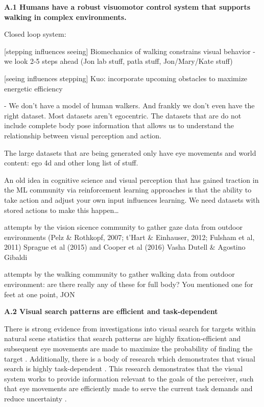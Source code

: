 
\textbf{A.1 Humans have a robust visuomotor control system that supports walking in complex environments.}

Closed loop system:

[stepping influences seeing] Biomechanics of walking constrains visual behavior 
- we look 2-5 steps ahead (Jon lab stuff, patla stuff, Jon/Mary/Kate stuff)

[seeing influences stepping] 
Kuo: incorporate upcoming obstacles to maximize energetic efficiency

- We don't have a model of human walkers. And frankly we don't even have the right dataset.  Most datasets aren't egocentric.  The datasets that are do not include complete body pose information that allows us to understand the relationship between visual perception and action.

The large datasets that are being generated only have eye movements and world content: ego 4d and other long list of stuff. 

An old idea in cognitive science and visual perception that has gained traction in the ML community via reinforcement learning approaches is that the ability to take action and adjust your own input influences learning. We need datasets with stored actions to make this happen\ldots{}\newline

attempts by the vision sicence community to gather gaze data from outdoor environments (Pelz \& Rothkopf, 2007; t'Hart \& Einhauser, 2012; Fulsham et al, 2011) Sprague et al (2015) and Cooper et al (2016) Vasha Dutell \& Agostino Gibaldi

attempts by the walking community to gather walking data from outdoor environment: are there really any of these for full body?  You mentioned one for feet at one point, JON


\noindent \textbf{A.2 Visual search patterns are efficient and task-dependent}

\noindent There is strong evidence from investigations into visual search for targets within natural scene statistics that search patterns are highly fixation-efficient and subsequent eye movements are made to maximize the probability of finding the target \cite{najemnik_optimal_2005}. Additionally, there is a body of research which demonstrates that visual search is highly task-dependent \cite{jovancevic-misic2009, tong2017, zhang2018, hayhoe2005, tatler2011, rothkopf2016}. This research demonstrates that the visual system works to provide information relevant to the goals of the perceiver, such that eye movements are efficiently made to serve the current task demands and reduce uncertainty \cite{Matthis2018}. 

